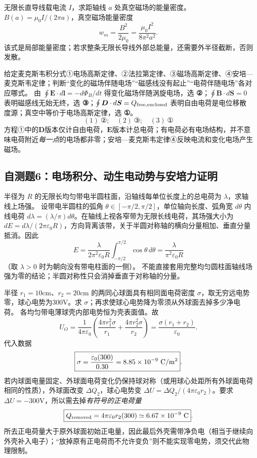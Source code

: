 \problemtext 无限长直导线载电流 $I$，求距轴线 $a$ 处真空磁场的能量密度。
\workings $B(a)=\mu_0I/(2\pi a)$，真空磁场能量密度
\[\boxed{w_m=\frac{B^2}{2\mu_0}=\frac{\mu_0I^2}{8\pi^2a^2}}.\]
\crosscheck 该式是局部能量密度；若求整条无限长导线外部总能量，还需要外半径截断，否则发散。

\problemtext 给定麦克斯韦积分式①电场高斯定律、②法拉第定律、③磁场高斯定律、④安培—麦克斯韦定律；判断“变化的磁场伴随电场”“磁感线没有起止”“电荷伴随电场”各对应哪式。
\workings 由 $\oint\bm E\cdot d\bm l=-d\Phi_B/dt$ 得变化磁场伴随涡旋电场，选 \textbf{②}；$\oint\bm B\cdot d\bm S=0$ 表明磁感线无始无终，选 \textbf{③}；$\oint\bm D\cdot d\bm S=Q_{\rm free,enclosed}$ 表明自由电荷是电位移散度源；真空中等价于电场高斯定律，选 \textbf{①}。
\[\boxed{(1)\ \text{②};\quad(2)\ \text{③};\quad(3)\ \text{①}}\]
\crosscheck 方程①中的$\bm D$版本仅计自由电荷，$\bm E$版本计总电荷；有电荷必有电场结构，并不意味电荷附近\emph{每一点}的电场都非零；安培—麦克斯韦定律④反映电流和变化电场产生磁场。

\subsection{自测题6：电场积分、动生电动势与安培力证明}

\problemtext 半径为 $R$ 的无限长均匀带电半圆柱面，沿轴线每单位长度上的总电荷为 $\lambda$，求轴线上场强。
\workings 设带电半圆柱的弧角 $\theta\in[-\pi/2,\pi/2]$，单位轴向长度、弧角宽 $d\theta$ 内线电荷 $d\lambda=(\lambda/\pi)d\theta$。在轴线上视各窄带为无限长线电荷，其场强大小为 $dE=d\lambda/(2\pi\varepsilon_0 R)$，方向背离该带，关于半圆对称轴的横向分量相加、垂直分量抵消。因此
\[
E=\frac{\lambda}{2\pi^2\varepsilon_0R}
\int_{-\pi/2}^{\pi/2}\cos\theta\,d\theta
=\boxed{\frac{\lambda}{\pi^2\varepsilon_0R}}
\]
（取 $\lambda>0$ 时为朝向没有带电柱面的一侧）。
\crosscheck 不能直接套用完整均匀圆柱面轴线场强为零的结论；半圆对称性只会消掉垂直于对称轴的分量。

\problemtext 半径 $r_1=10$cm、$r_2=20$cm 的两同心球面具有相同面电荷密度 $\sigma$，取无穷远电势零，球心电势为300V。求 $\sigma$；再求使球心电势降为零须从外球面去掉多少净电荷。
\workings 各均匀带电薄球壳内部电势恒为壳表面值。故
\[
U_O=\frac{1}{4\pi\varepsilon_0}
\left(\frac{4\pi r_1^2\sigma}{r_1}+
\frac{4\pi r_2^2\sigma}{r_2}\right)
=\frac{\sigma(r_1+r_2)}{\varepsilon_0}.
\]
代入数据
\[\boxed{\sigma=\frac{\varepsilon_0(300)}{0.30}
=8.85\times10^{-9}\ {\rm C/m^2}}.\]
若内球面电量固定、外球面电荷变化仍保持球对称（或用球心处距所有外球面电荷相同的性质），外球面改变 $\Delta Q_2$，球心电势变 $\Delta U=\Delta Q_2/(4\pi\varepsilon_0r_2)$。要求 $\Delta U=-300$V，所以需去掉\emph{有符号的正电荷量}
\[
\boxed{Q_{\rm removed}=4\pi\varepsilon_0r_2(300)
\simeq6.67\times10^{-9}\ {\rm C}}.
\]
\crosscheck 所去正电荷量大于原外球面初始正电量，因此最后外壳需带净负电（相当于继续向外壳补入电子）；“放掉原有正电荷而不允许变负”则不能实现零电势，须交代此物理限制。

